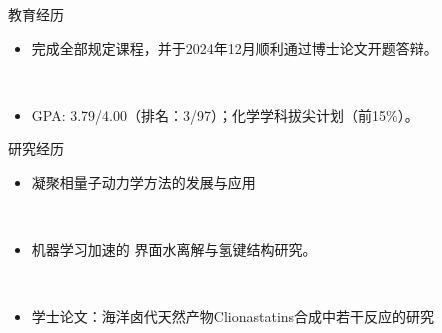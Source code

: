 \documentclass{resume}
\begin{document}
\begin{rSection}{教育经历}
     \\
    \begin{itemize}[noitemsep, nosep]
        \item 完成全部规定课程，并于2024年12月顺利通过博士论文开题答辩。
    \end{itemize}

     \\
    \begin{itemize}[noitemsep, nosep]
        \item GPA: 3.79/4.00（排名：3/97）；化学学科拔尖计划（前15\%）。
    \end{itemize}
\end{rSection}

\begin{rSection}{研究经历}
     \\
    \begin{itemize}[noitemsep, nosep]
        \item 凝聚相量子动力学方法的发展与应用
    \end{itemize}

     \\
    \begin{itemize}[noitemsep, nosep]
        \item 机器学习加速的  界面水离解与氢键结构研究。
    \end{itemize}

     \\
    \begin{itemize}[noitemsep, nosep]
        \item 学士论文：海洋卤代天然产物Clionastatins合成中若干反应的研究
    \end{itemize}
\end{rSection}
\end{document}
